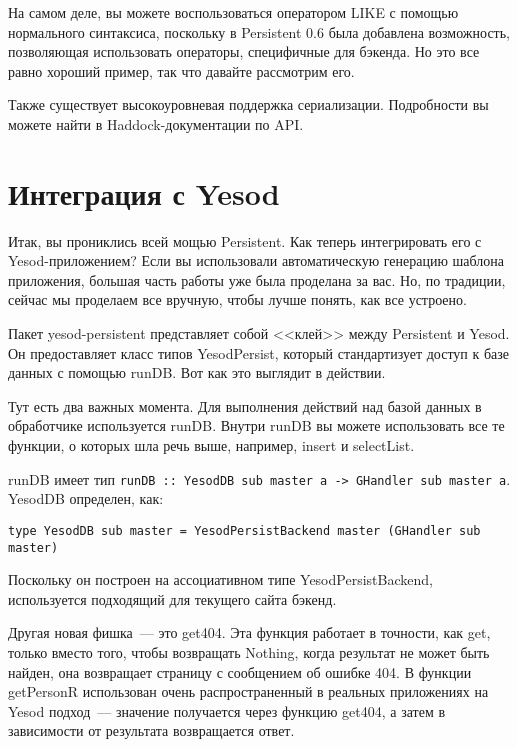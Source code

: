 \begin{remark}
На самом деле, вы можете воспользоваться оператором LIKE с помощью нормального синтаксиса, поскольку в Persistent 0.6 была добавлена возможность, позволяющая использовать операторы, специфичные для бэкенда. Но это все равно хороший пример, так что давайте рассмотрим его.
\end{remark}


Также существует высокоуровневая поддержка сериализации. Подробности вы можете найти в Haddock-документации по API.

\section{Интеграция с Yesod} %

Итак, вы прониклись всей мощью Persistent. Как теперь интегрировать его с Yesod-приложением? Если вы использовали автоматическую генерацию шаблона приложения, большая часть работы уже была проделана за вас. Но, по традиции, сейчас мы проделаем все вручную, чтобы лучше понять, как все устроено.

Пакет yesod-persistent представляет собой <<клей>> между Persistent и Yesod. Он предоставляет класс типов YesodPersist, который стандартизует доступ к базе данных с помощью runDB. Вот как это выглядит в действии.


Тут есть два важных момента. Для выполнения действий над базой данных в обработчике используется runDB. Внутри runDB вы можете использовать все те функции, о которых шла речь выше, например, insert и selectList. 

\begin{remark}
runDB имеет тип \lstinline'runDB :: YesodDB sub master a -> GHandler sub master a'. YesodDB определен, как:

\begin{lstlisting}
type YesodDB sub master = YesodPersistBackend master (GHandler sub master)
\end{lstlisting}

Поскольку он построен на ассоциативном типе YesodPersistBackend, используется подходящий для текущего сайта бэкенд.
\end{remark}

Другая новая фишка~--- это get404. Эта функция работает в точности, как get, только вместо того, чтобы возвращать Nothing, когда результат не может быть найден, она возвращает страницу с сообщением об ошибке 404. В функции getPersonR использован очень распространенный в реальных приложениях на Yesod подход~--- значение получается через функцию get404, а затем в зависимости от результата возвращается ответ.

